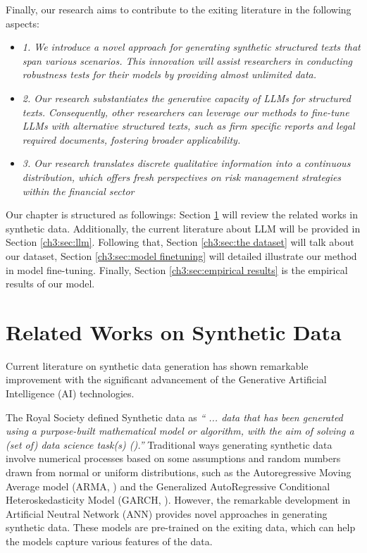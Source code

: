 Finally, our research aims to contribute to the exiting literature in the following aspects:
\begin{itemize}
    \item \textit{1. We introduce a novel approach for generating synthetic structured texts that span various scenarios. This innovation will assist researchers in conducting robustness tests for their models by providing almost unlimited data.}
    \item \textit{2. Our research substantiates the generative capacity of LLMs for structured texts. Consequently, other researchers can leverage our methods to fine-tune LLMs with alternative structured texts, such as firm specific reports and legal required documents, fostering broader applicability.}
    \item \textit{3. Our research translates discrete qualitative information into a continuous distribution, which offers fresh perspectives on risk management strategies within the financial sector}
\end{itemize}


Our chapter is structured as followings: Section \ref{ch3:sec:related work} will review the related works in synthetic data. Additionally, the current literature about LLM will be provided in Section \ref{ch3:sec:llm}. Following that, Section \ref{ch3:sec:the dataset} will talk about our dataset, Section \ref{ch3:sec:model finetuning} will detailed illustrate our method in model fine-tuning. Finally, Section \ref{ch3:sec:empirical results} is the empirical results of our model. 




\section{Related Works on Synthetic Data}\label{ch3:sec:related work}
Current literature on synthetic data generation has shown remarkable improvement with the significant advancement of the Generative Artificial Intelligence (AI) technologies. 

The Royal Society defined Synthetic data as \textit{`` ... data that has been generated using a purpose-built mathematical model or algorithm, with the aim of solving a (set of) data science task(s) (\cite{jordon2022synthetic}).''}  Traditional ways generating synthetic data involve numerical processes based on some assumptions and random numbers drawn from normal or uniform distributions, such as the Autoregressive Moving Average model (ARMA, \cite{whittle1951hypothesis}) and the Generalized AutoRegressive Conditional Heteroskedasticity Model (GARCH, \cite{Bollerslev:1986}). However, the remarkable development in Artificial Neutral Network (ANN) provides novel approaches in generating synthetic data. These models are pre-trained on the exiting data, which can help the models capture various features of the data. 

